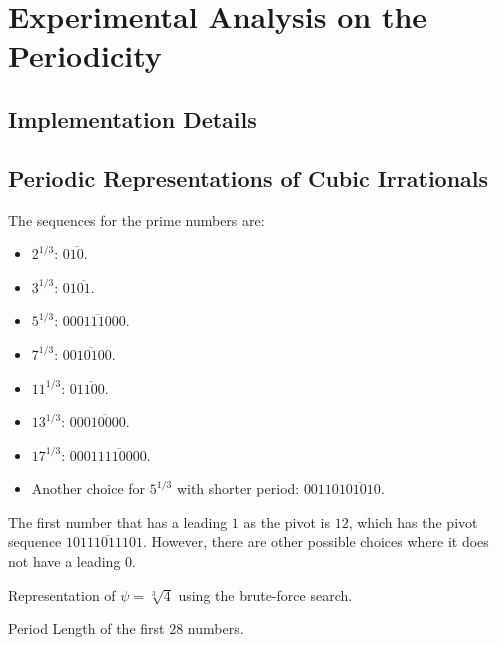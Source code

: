 \chapter{Experimental Analysis on the Periodicity}

\section{Implementation Details}

\section{Periodic Representations of Cubic Irrationals}

\begin{example}
  The sequences for the prime numbers are:
  \begin{itemize}
    \item $2^{1/3}$: $0\overline{10}$.
    \item $3^{1/3}$: $01\overline{01}$.
    \item $5^{1/3}$: $0\overline{00111000}$.
    \item $7^{1/3}$: $0\overline{010100}$.
    \item $11^{1/3}$: $0\overline{1100}$.
    \item $13^{1/3}$: $00\overline{010000}$.
    \item $17^{1/3}$: $000\overline{11110000}$.
    \item Another choice for $5^{1/3}$ with shorter period: $00110\overline{101010}$.
  \end{itemize}
\end{example}

\begin{remark}
  The first number that has a leading $1$ as the pivot is $12$,
  which has the pivot sequence $1\overline{0111011101}$.
  However, there are other possible choices where it does not have a leading $0$.
\end{remark}

\begin{table}[t]
  \caption{Representation of $ψ = \sqrt[3]{4}$ using the brute-force search.}
  \label{table:cube-root-4}
  \centering
  
\end{table}

\begin{table}[t]
  \caption{Period Length of the first $28$ numbers.}
  \centering
  
\end{table}


